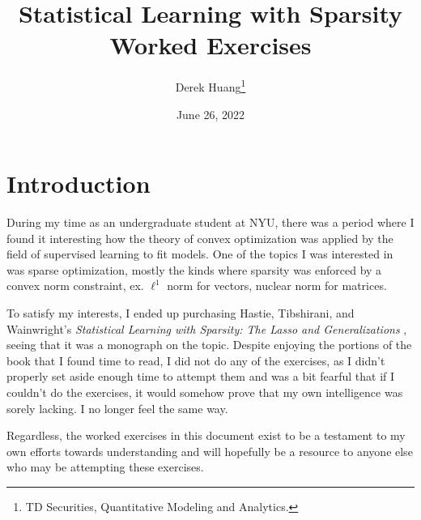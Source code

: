 \documentclass{article}
\title{Statistical Learning with Sparsity \\ \Large Worked Exercises}
\author{%
    Derek Huang\thanks{TD Securities, Quantitative Modeling and Analytics.}
}
\date{June 26, 2022}
\numberwithin{equation}{section}
\begin{document}
\newcommand{\newtocsubsection}[1]{%
    \subsection*{#1} \addcontentsline{toc}{subsection}{#1}%
}

\maketitle


\tableofcontents

\newpage

\section{Introduction}

During my time as an undergraduate student at NYU, there was a period where
I found it interesting how the theory of convex optimization was applied by
the field of supervised learning to fit models. One of the topics I was
interested in was sparse optimization, mostly the kinds where sparsity was
enforced by a convex norm constraint, ex. $ \ell^1 $ norm for vectors,
nuclear norm for matrices.

\medskip

To satisfy my interests, I ended up purchasing Hastie, Tibshirani, and
Wainwright's \textit{%
    Statistical Learning with Sparsity: The Lasso and Generalizations%
}, seeing that it was a monograph on the topic. Despite enjoying the portions
of the book that I found time to read, I did not do any of the exercises,
as I didn't properly set aside enough time to attempt them and was a bit
fearful that if I couldn't do the exercises, it would somehow prove that my
own intelligence was sorely lacking. I no longer feel the same way.

\medskip

Regardless, the worked exercises in this document exist to be a testament
to my own efforts towards understanding and will hopefully be a resource to
anyone else who may be attempting these exercises.

\medskip

\end{document}
